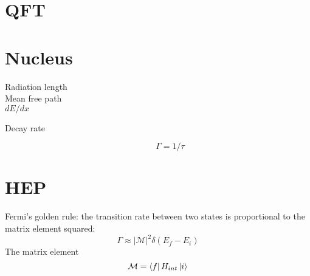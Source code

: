 \section{QFT}

\section{Nucleus}
\begin{description}
    \item [Radiation length]
    \item [Mean free path]
    \item [$dE/dx$]
\end{description}

\begin{description}
    \item [Decay rate] 
	\begin{equation}
	    \label{eqn:nu::decayRate}
	    \Gamma = 1/\tau
	\end{equation}
\end{description}

\section{HEP}
Fermi's golden rule: the transition rate between two states is proportional
to the matrix element squared:
\begin{equation}
    \label{Fermi's golden rule}
    \Gamma \approx |\mathcal{M}|^2\delta(E_f-E_i)
\end{equation}
The matrix element
\begin{equation}
    \label{matrix element}
    \mathcal{M} = \bra{f}H_{int}\ket{i}
\end{equation}
